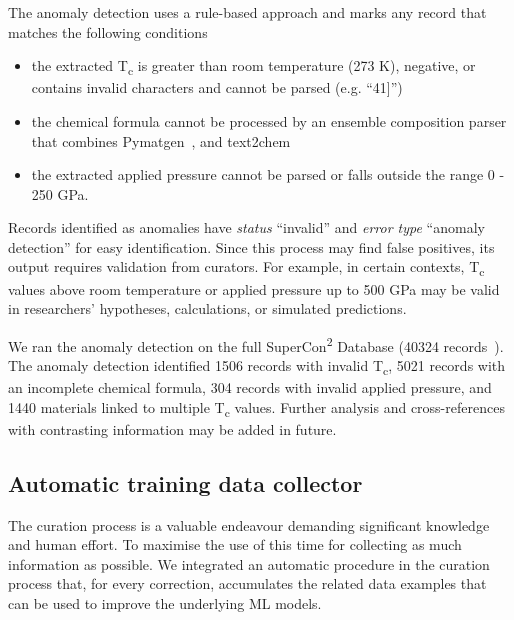 \documentclass[]{interact}
\theoremstyle{plain} %
\theoremstyle{definition}
\theoremstyle{remark}
\begin{document}
The anomaly detection uses a rule-based approach and marks any record that matches the following conditions
\begin{itemize}
    \item the extracted T\textsubscript{c} is greater than room temperature (273 K), negative, or contains invalid characters and cannot be parsed (e.g. ``41]'')
    \item the chemical formula cannot be processed by an ensemble composition parser that combines Pymatgen~\cite{Ong2013}, and text2chem~\cite{kononova_text-mined_2019} 
    \item the extracted applied pressure cannot be parsed or falls outside the range 0 - 250 GPa.
\end{itemize}

Records identified as anomalies have \emph{status} ``invalid'' and \emph{error type} ``anomaly detection'' for easy identification.
Since this process may find false positives, its output requires validation from curators. 
For example, in certain contexts, T\textsubscript{c} values above room temperature or applied pressure up to 500 GPa may be valid in researchers' hypotheses, calculations, or simulated predictions. 

We ran the anomaly detection on the full SuperCon\textsuperscript{2} Database (40324 records~\cite{lfoppiano2023automatic}). 
The anomaly detection identified 1506 records with invalid T\textsubscript{c}, 5021 records with an incomplete chemical formula, 304 records with invalid applied pressure, and 1440 materials linked to multiple T\textsubscript{c} values. 
Further analysis and cross-references with contrasting information may be added in future. 

\subsection{Automatic training data collector}
\label{subsec:feedback-loop-training-data}
The curation process is a valuable endeavour demanding significant knowledge and human effort. 
To maximise the use of this time for collecting as much information as possible.
We integrated an automatic procedure in the curation process that, for every correction, accumulates the related data examples that can be used to improve the underlying ML models. 
\end{document}
